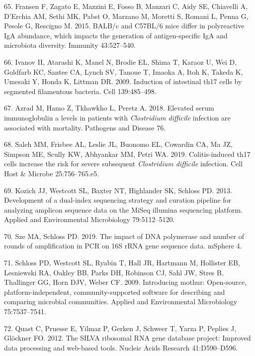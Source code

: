 \documentclass[
  11pt,
]{article}
\begin{document}
\leavevmode\hypertarget{ref-Fransen2015}{}%
65. Fransen F, Zagato E, Mazzini E, Fosso B, Manzari C, Aidy SE,
Chiavelli A, D'Erchia AM, Sethi MK, Pabst O, Marzano M, Moretti S,
Romani L, Penna G, Pesole G, Rescigno M. 2015. BALB/c and C57BL/6 mice
differ in polyreactive IgA abundance, which impacts the generation of
antigen-specific IgA and microbiota diversity. Immunity 43:527--540.

\leavevmode\hypertarget{ref-Ivanov2009}{}%
66. Ivanov II, Atarashi K, Manel N, Brodie EL, Shima T, Karaoz U, Wei D,
Goldfarb KC, Santee CA, Lynch SV, Tanoue T, Imaoka A, Itoh K, Takeda K,
Umesaki Y, Honda K, Littman DR. 2009. Induction of intestinal th17 cells
by segmented filamentous bacteria. Cell 139:485--498.

\leavevmode\hypertarget{ref-Azrad2018}{}%
67. Azrad M, Hamo Z, Tkhawkho L, Peretz A. 2018. Elevated serum
immunoglobulin a levels in patients with \emph{Clostridium difficile}
infection are associated with mortality. Pathogens and Disease 76.

\leavevmode\hypertarget{ref-Saleh2019}{}%
68. Saleh MM, Frisbee AL, Leslie JL, Buonomo EL, Cowardin CA, Ma JZ,
Simpson ME, Scully KW, Abhyankar MM, Petri WA. 2019. Colitis-induced
th17 cells increase the risk for severe subsequent \emph{Clostridium
difficile} infection. Cell Host \& Microbe 25:756--765.e5.

\leavevmode\hypertarget{ref-Kozich2013}{}%
69. Kozich JJ, Westcott SL, Baxter NT, Highlander SK, Schloss PD. 2013.
Development of a dual-index sequencing strategy and curation pipeline
for analyzing amplicon sequence data on the MiSeq illumina sequencing
platform. Applied and Environmental Microbiology 79:5112--5120.

\leavevmode\hypertarget{ref-Sze2019}{}%
70. Sze MA, Schloss PD. 2019. The impact of DNA polymerase and number of
rounds of amplification in PCR on 16S rRNA gene sequence data. mSphere
4.

\leavevmode\hypertarget{ref-Schloss2009}{}%
71. Schloss PD, Westcott SL, Ryabin T, Hall JR, Hartmann M, Hollister
EB, Lesniewski RA, Oakley BB, Parks DH, Robinson CJ, Sahl JW, Stres B,
Thallinger GG, Horn DJV, Weber CF. 2009. Introducing mothur:
Open-source, platform-independent, community-supported software for
describing and comparing microbial communities. Applied and
Environmental Microbiology 75:7537--7541.

\leavevmode\hypertarget{ref-Quast2012}{}%
72. Quast C, Pruesse E, Yilmaz P, Gerken J, Schweer T, Yarza P, Peplies
J, Glöckner FO. 2012. The SILVA ribosomal RNA gene database project:
Improved data processing and web-based tools. Nucleic Acids Research
41:D590--D596.
\end{document}
